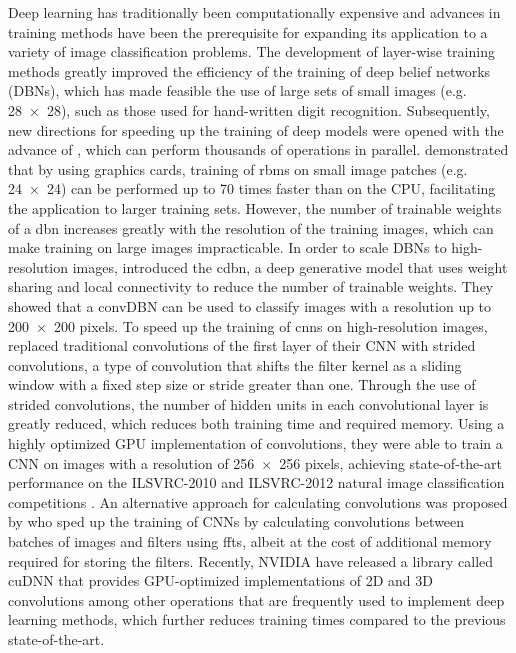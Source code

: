 Deep learning has traditionally been computationally expensive and advances in
training methods have been the prerequisite for expanding its application to a
variety of image classification problems. The development of layer-wise training
methods \citep{hinton2006b} greatly improved the efficiency of the training of
deep belief networks (DBNs), which has made feasible the use of large sets of
small images (e.g. \num{28x28}), such as those used for hand-written digit
recognition. Subsequently, new directions for speeding up the training of deep
models were opened with the advance of , which can perform thousands of operations in parallel.
\citet{raina2009} demonstrated that by using graphics cards, training of
\glspl{rbm} on small image patches (e.g. \num{24x24}) can be performed up to
\num{70} times faster than on the CPU, facilitating the application to larger
training sets. However, the number of trainable weights of a \gls{dbn} increases
greatly with the resolution of the training images, which can make training on
large images impracticable. In order to scale DBNs to high-resolution images,
\citet{lee2009,lee2011} introduced the \gls{cdbn}, a deep generative model that
uses weight sharing and local connectivity to reduce the number of trainable
weights. They showed that a convDBN can be used to classify images with a
resolution up to \num{200x200} pixels. To speed up the training of \glspl{cnn}
on high-resolution images, \citet{krizhevsky2012} replaced traditional
convolutions of the first layer of their CNN with strided convolutions, a type
of convolution that shifts the filter kernel as a sliding window with a fixed
step size or stride greater than one. Through the use of strided convolutions,
the number of hidden units in each convolutional layer is greatly reduced, which
reduces both training time and required memory. Using a highly optimized GPU
implementation of convolutions, they were able to train a CNN on images with a
resolution of \num{256x256} pixels, achieving state-of-the-art performance on
the ILSVRC-2010 and ILSVRC-2012 natural image classification competitions
\citep{krizhevsky2012}. An alternative approach for calculating convolutions was
proposed by \citet{mathieu2013} who sped up the training of CNNs by calculating
convolutions between batches of images and filters using \glspl{fft}, albeit at
the cost of additional memory required for storing the filters. Recently, NVIDIA
have released a library called cuDNN \citep{chetlur2014} that provides
GPU-optimized implementations of 2D and 3D convolutions among other operations
that are frequently used to implement deep learning methods, which further
reduces training times compared to the previous state-of-the-art.


